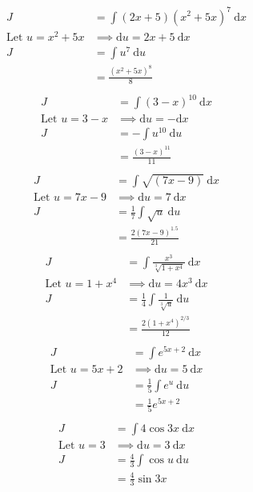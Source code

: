 \documentclass{article}
\theoremstyle{plain}
\theoremstyle{definition}
\begin{document}
\begin{align*}
	J&=\int (2x+5){(x^2+5x)}^7\ \text{d}x \\
	\text{Let } u = x^2+5x &\implies \text{d}u = 2x+5\ \text{d}x \\
	J&=\int u^7\ \text{d}u \\
	 &=\frac{{\left(x^2+5x\right)}^8}{8} \\
\end{align*}
\begin{align*}
	J&=\int {(3-x)}^{10}\ \text{d}x \\
	\text{Let } u = 3-x &\implies \text{d}u = - \text{d}x \\
	J&=-\int u^{10}\ \text{d}u \\
	 &=\frac{{\left(3-x\right)}^{11}}{11} \\
\end{align*}
\begin{align*}
	J&=\int \sqrt{(7x-9)}\ \text{d}x \\
	\text{Let } u = 7x-9 &\implies \text{d}u = 7\ \text{d}x \\
	J&=\frac{1}{7}\int \sqrt{u}\ \text{d}u \\
	 &=\frac{{2\left(7x-9\right)}^{1.5}}{21} \\
\end{align*}
\begin{align*}
	J&=\int \frac{x^3}{\sqrt[3]{1+x^4}}\ \text{d}x \\
	\text{Let } u = 1+x^4 &\implies \text{d}u = 4x^3\ \text{d}x \\
	J&=\frac{1}{4}\int \frac{1}{\sqrt[3]{u}}\ \text{d}u \\
	 &=\frac{{2\left(1+x^4\right)}^{2/3}}{12} \\
\end{align*}
\begin{align*}
	J&=\int e^{5x+2}\ \text{d}x \\
	\text{Let } u = 5x+2 &\implies \text{d}u = 5\ \text{d}x \\
	J&=\frac{1}{5}\int e^u\ \text{d}u \\
	 &=\frac{1}{5}e^{5x+2} \\
\end{align*}
\begin{align*}
	J&=\int 4\cos 3x\ \text{d}x \\
	\text{Let } u = 3 &\implies \text{d}u = 3\ \text{d}x \\
	J&=\frac{4}{3}\int \cos u\ \text{d}u \\
	 &=\frac{4}{3}\sin 3x \\
\end{align*}
\end{document}
